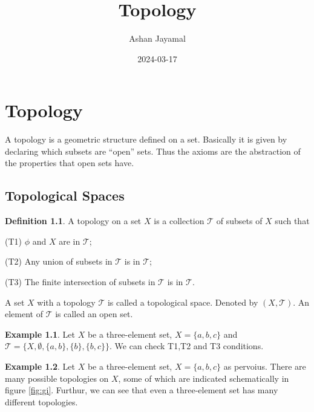 \documentclass[
]{book}
\title{Topology}
\author{Ashan Jayamal}
\date{2024-03-17}
\theoremstyle{definition}
\newtheorem{definition}{Definition}[chapter]
\theoremstyle{definition}
\newtheorem{example}{Example}[chapter]
\theoremstyle{definition}
\theoremstyle{definition}
\theoremstyle{remark}
\begin{document}
\maketitle

{
\setcounter{tocdepth}{1}
\tableofcontents
}
\hypertarget{topology}{%
\chapter{Topology}\label{topology}}

A topology is a geometric structure defined on a set. Basically it is given by declaring which subsets are ``open'' sets. Thus the axioms are the abstraction of the properties that open sets have.

\hypertarget{topological-spaces}{%
\section{Topological Spaces}\label{topological-spaces}}

\begin{definition}
\protect\hypertarget{def:Top}{}\label{def:Top}A topology on a set \(X\) is a collection \(\mathcal{T}\) of subsets of \(X\) such that

(T1) \(\phi\) and \(X\) are in \(\mathcal{T}\);

(T2) Any union of subsets in \(\mathcal{T}\) is in \(\mathcal{T}\);

(T3) The finite intersection of subsets in \(\mathcal{T}\) is in \(\mathcal{T}\).
\end{definition}

A set \(X\) with a topology \(\mathcal{T}\) is called a topological space. Denoted by \((X,\mathcal{T})\). An element of \(\mathcal{T}\) is called an open set.

\begin{example}
\protect\hypertarget{exm:unnamed-chunk-1}{}\label{exm:unnamed-chunk-1}Let \(X\) be a three-element set, \(X = \{a, b, c\}\) and \(\mathcal{T}=\{X, \emptyset,\{a, b\}, \{b\}, \{b, c\}\}\). We can check T1,T2 and T3 conditions.
\end{example}

\begin{example}
\protect\hypertarget{exm:unnamed-chunk-2}{}\label{exm:unnamed-chunk-2}Let \(X\) be a three-element set, \(X = \{a, b, c\}\) as pervoius. There are many possible topologies on \(X\), some of which are indicated schematically in figure \ref{fig:gi}. Furthur, we can see that even a three-element set has many different topologies.
\end{example}
\end{document}
